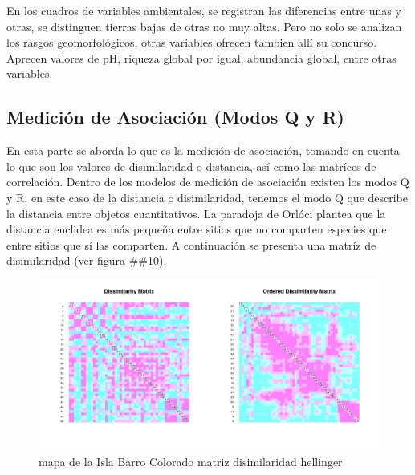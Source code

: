 \documentclass[11pt,]{article}
\begin{document}
En los cuadros de variables ambientales, se registran las diferencias
entre unas y otras, se distinguen tierras bajas de otras no muy altas.
Pero no solo se analizan los rasgos geomorfológicos, otras variables
ofrecen tambien allí su concurso. Aprecen valores de pH, riqueza global
por igual, abundancia global, entre otras variables.

\subsection{Medición de Asociación (Modos Q y
R)}\label{mediciuxf3n-de-asociaciuxf3n-modos-q-y-r}

En esta parte se aborda lo que es la medición de asociación, tomando en
cuenta lo que son los valores de disimilaridad o distancia, así como las
matríces de correlación. Dentro de los modelos de medición de asociación
existen los modos Q y R, en este caso de la distancia o disimilaridad,
tenemos el modo Q que describe la distancia entre objetos cuantitativos.
La paradoja de Orlóci plantea que la distancia euclidea es más pequeña
entre sitios que no comparten especies que entre sitios que sí las
comparten. A continuación se presenta una matríz de disimilaridad (ver
figura \#\#10).

\begin{figure}
\centering
\includegraphics[width=1.00000\textwidth]{matriz_disimilaridad_hellinger.png}
\caption{mapa de la Isla Barro Colorado matriz disimilaridad hellinger
\label{fig:bci_map}}
\end{figure}
\end{document}
